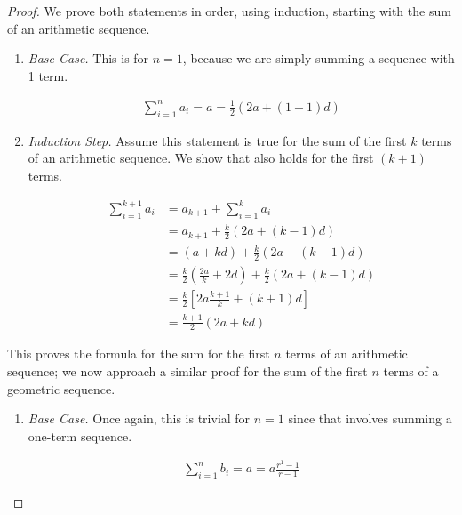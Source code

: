 \documentclass[twoside]{report}
\begin{document}
\begin{proof}
	We prove both statements in order, using induction, starting with the sum of an arithmetic sequence.
	
	\vspace{\baselineskip}
	\begin{enumerate}
		\item \emph{Base Case.} This is for $n = 1$, because we are simply summing a sequence with 1 term.
		
		\begin{align*}
			\sum_{i = 1}^n a_i = a = \frac{1}{2} (2a + (1 - 1)d)
		\end{align*}
		
		\item \emph{Induction Step.} Assume this statement is true for the sum of the first $k$ terms of an arithmetic sequence. We show that also holds for the first $(k + 1)$ terms.
		
		\begin{align*}
			\sum_{i = 1}^{k + 1} a_i &=  a_{k + 1} + \sum_{i = 1}^k a_i \\
			&= a_{k + 1} + \frac{k}{2} \left( 2a + (k - 1)d \right) \\
			&= (a + kd) + \frac{k}{2} \left( 2a + (k - 1)d \right) \\
			&= \frac{k}{2} \left( \frac{2a}{k} + 2d \right) + \frac{k}{2} \left( 2a + (k - 1)d \right) \\
			&= \frac{k}{2} \left[ 2a \frac{k + 1}{k} + (k + 1)d
			 \right] \\
			&= \frac{k + 1}{2} \left( 2a + kd \right)
		\end{align*}
	\end{enumerate}
	\vspace{\baselineskip}
	
	This proves the formula for the sum for the first $n$ terms of an arithmetic sequence; we now approach a similar proof for the sum of the first $n$ terms of a geometric sequence.
	
	\vspace{\baselineskip}
	\begin{enumerate}
		\item \emph{Base Case.} Once again, this is trivial for $n = 1$ since that involves summing a one-term sequence.
		
		\begin{align*}
			\sum_{i = 1}^n b_i = a = a \frac{r^1 - 1}{r - 1}
		\end{align*}
		

\end{enumerate}
\end{proof}
\end{document}
